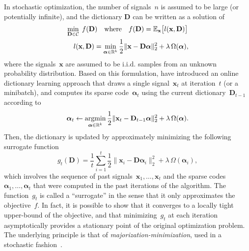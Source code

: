 \documentclass{article}
\def\E{{\mathbb E}}
\def\RR{{\mathbb{R}}}
\def\x{{\mathbf x}}
\def\D{{\mathbf D}}
\def\x{{\mathbf x}}
\newcommand{\argmin}{\operatornamewithlimits{\mathrm{argmin}}}
\newcommand{\balpha}{\boldsymbol{\alpha}}
\begin{document}
In stochastic optimization, the number of signals~$n$ is assumed to
be large (or potentially infinite), and the dictionary $\D$ can be written as a
solution of
\begin{gather}
\label{eq:expected_loss}
    \min_{\D\in \mathcal{C}} \; f(\D)\quad\text{where}\quad f(\D) = \E_\x \bigl[l(\x, \D)\bigr]
    \\
    \quad l(\x, \D) = \min_{\balpha \in \RR^k} \frac{1}{2} \Vert \x - \D \balpha \Vert_2^2
    + \lambda\, \Omega(\balpha), \notag
\end{gather}
where the signals~$\x$ are assumed to be i.i.d. samples from an unknown probability distribution.
Based on this formulation, \citet{mairal_online_2010} have introduced an online
dictionary learning approach that draws a single signal~$\x_t$ at iteration~$t$ (or a
minibatch), and computes its sparse
code~$\balpha_t$ using the current dictionary~$\D_{t-1}$ according to
\begin{equation}
   \balpha_t \leftarrow \argmin_{\balpha \in \RR^k} \frac{1}{2} \Vert \x_t -\D_{t - 1} \balpha
   \Vert^2_2 + \lambda \,\Omega(\balpha).\label{eq:alpha}
\end{equation}
Then, the dictionary is updated by approximately minimizing the following surrogate
function
\begin{equation}
    \label{eq:original_surrogate}
    g_t (\D) = \frac{1}{t} \sum_{i = 1}^t \frac{1}{2} \bigl\| \x_i - \D \balpha_i
	    \bigr\|_2^2
     + \lambda \,\Omega(\balpha_i),
\end{equation}
which involves the sequence of past signals~$\x_1,\ldots,\x_t$ and the sparse
codes~$\balpha_1,\ldots,\balpha_t$ that were computed in the past iterations
of the algorithm.
The function~$g_t$ is called a ``surrogate'' in the sense that it only
approximates the objective~$f$.
In fact, it is possible to show that it converges to a locally tight upper-bound
of the objective, and that minimizing~$g_t$ at each iteration asymptotically
provides a stationary point of the original optimization problem.
The underlying principle is that of \emph{majorization-minimization}, used
in a stochastic fashion~\citep{mairal_stochastic_2013}.
\end{document}
